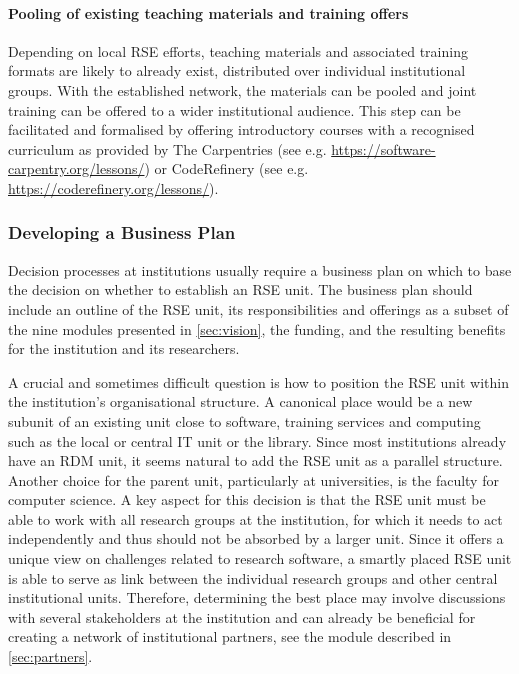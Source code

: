 \documentclass[10pt,letterpaper]{article}
\begin{document}
\paragraph{Pooling of existing teaching materials and training offers}
Depending on local RSE efforts, teaching materials and associated training formats are likely to already exist, distributed over individual institutional groups.
With the established network, the materials can be pooled and joint training can be offered to a wider institutional audience.
This step can be facilitated and formalised by offering introductory courses with a recognised curriculum as provided by The Carpentries (see e.g. \url{https://software-carpentry.org/lessons/})
or CodeRefinery (see e.g. \url{https://coderefinery.org/lessons/}).

\subsubsection*{Developing a Business Plan}
Decision processes at institutions usually require a business plan on which to base the decision on whether to establish an RSE unit.
The business plan should include an outline of the RSE unit, its responsibilities and offerings as a subset of the nine modules presented in \autoref{sec:vision}, the funding, and the resulting benefits for the institution and its researchers.

A crucial and sometimes difficult question is how to position the RSE unit within the institution’s organisational structure.
A canonical place would be a new subunit of an existing unit close to software, training services and computing such as the local or central IT unit or the library.
Since most institutions already have an RDM unit, it seems natural to add the RSE unit as a parallel structure.
Another choice for the parent unit, particularly at universities, is the faculty for computer science.
A key aspect for this decision is that the RSE unit must be able to work with all research groups at the institution, for which it needs to act independently and thus should not be absorbed by a larger unit.
Since it offers a unique view on challenges related to research software, a smartly placed RSE unit is able to serve as link between the individual research groups and other central institutional units.
Therefore, determining the best place may involve discussions with several stakeholders at the institution and can already be beneficial for creating a network of institutional partners, see the module described in \autoref{sec:partners}.
\end{document}
